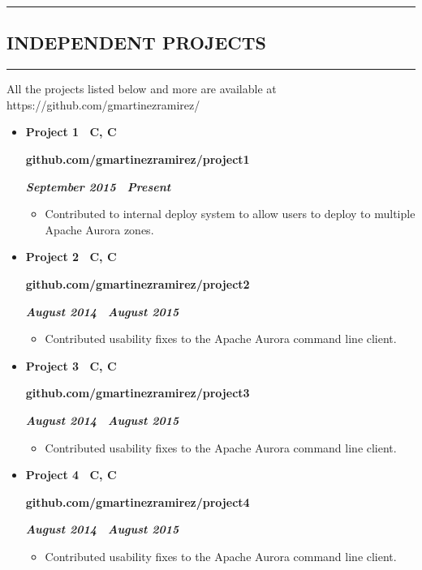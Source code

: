 \documentclass[10pt,letterpaper]{article}
\newcommand{\textbox}[1]{
  \parbox{.333\textwidth}{#1}
}
\newcommand{\CPP}
{C\nolinebreak[4]\hspace{-.05em}\raisebox{.22ex}{\footnotesize\bf ++}}
\newcommand{\sectionTitle}[1]{
  \hrule
  \vspace{-1.0em} 
  \subsection*{\uppercase{\textbf{#1}}}
  \vspace{-0.3em}
    \hrule
    \vspace{0.3em}  
}
\newcommand{\titleExperienceWithoutLocation}[4]{
  \vspace{1.0em}
  \item[]
  {
    \textbox{\textbf{#1}\hfill}\textbox{\hfil \textbf{#2}\hfil}\hfill \textbf{\emph{#3 \textendash \ #4}}
  }
}
\begin{document}
  \sectionTitle{Independent Projects}
  \noindent All the projects listed below and more are available at https://github.com/gmartinezramirez/
  \vspace{-0.9em}
  \begin{itemize}
    \parskip=-0.6em 
    \titleExperienceWithoutLocation{Project 1 \ C, \CPP}{github.com/gmartinezramirez/project1}{September 2015}{Present}
      \begin{itemize}[label=\textbullet]
        \itemsep0em
        \item Contributed to internal deploy system to allow users to deploy to multiple Apache Aurora zones.
      \end{itemize}
  
    \vspace{-0.4em} 
    \titleExperienceWithoutLocation{Project 2 \ C, \CPP}{github.com/gmartinezramirez/project2}{August 2014}{August 2015}
      \begin{itemize}[label=\textbullet]
        \itemsep0em
        \item Contributed usability fixes to the Apache Aurora command line client.
      \end{itemize}

    \vspace{-0.4em} 
    \titleExperienceWithoutLocation{Project 3 \ C, \CPP}{github.com/gmartinezramirez/project3}{August 2014}{August 2015}
      \begin{itemize}[label=\textbullet]
        \itemsep0em
        \item Contributed usability fixes to the Apache Aurora command line client.
      \end{itemize}
    \vspace{-0.4em} 
    \titleExperienceWithoutLocation{Project 4 \ C, \CPP}{github.com/gmartinezramirez/project4}{August 2014}{August 2015}
    \begin{itemize}[label=\textbullet]
      \itemsep0em
      \item Contributed usability fixes to the Apache Aurora command line client.
    \end{itemize}
  \end{itemize}
\end{document}
